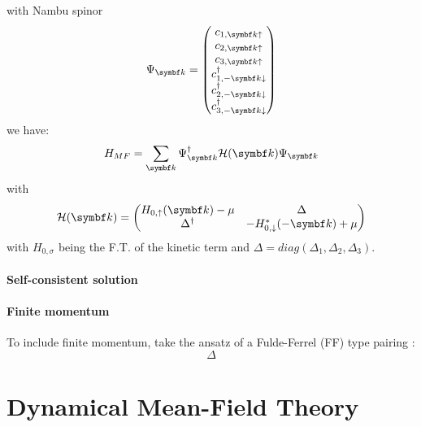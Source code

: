 \documentclass[../notes.tex]{subfiles}
\begin{document}
with Nambu spinor
\begin{equation}
	\Psi_{\vb{k}} =
	\begin{pmatrix}
		c_{1, \vb{k} \uparrow} \\
		c_{2, \vb{k} \uparrow} \\
		c_{3, \vb{k} \uparrow} \\
		c_{1, -\vb{k} \downarrow}^{\dagger} \\
		c_{2, -\vb{k} \downarrow}^{\dagger} \\
		c_{3, -\vb{k} \downarrow}^{\dagger} \\
	\end{pmatrix}
\end{equation}
we have:
\begin{equation}
	H_{MF} = \sum_{\vb{k}} \Psi_{\vb{k}}^{\dagger} \mathcal{H} (\vb{k}) \Psi_{\vb{k}}
\end{equation}
with
\begin{equation}
	\mathcal{H} (\vb{k}) =
	\begin{pmatrix}
		H_{0, \uparrow} (\vb{k}) - \mu & \Delta \\
		\Delta^{\dagger} & - H_{0, \downarrow}^* (-\vb{k}) + \mu
	\end{pmatrix}
\end{equation}
with \(H_{0, \sigma}\) being the F.T. of the kinetic term and \(\Delta = diag(\Delta_1, \Delta_2, \Delta_3)\).




\paragraph{Self-consistent solution}


\paragraph{Finite momentum}

To include finite momentum, take the ansatz of a Fulde-Ferrel (FF) type pairing \cite{kinnunenFuldeFerrellLarkin2018}:
\begin{equation}
	\Delta
\end{equation}


\section{Dynamical Mean-Field Theory}\label{sec:Dynamical Mean-Field Theory}
\end{document}
